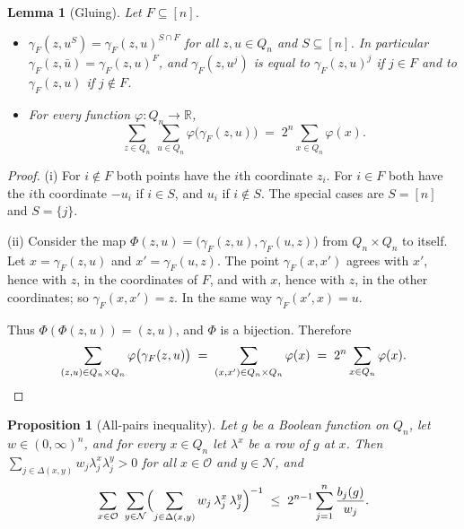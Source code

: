 \documentclass[11pt,reqno]{amsart}
\newtheorem{lemma}[theorem]{Lemma}
\newtheorem{proposition}[theorem]{Proposition}
\theoremstyle{definition}
\theoremstyle{remark}
\numberwithin{equation}{section}
\theoremstyle{named}
\theoremstyle{plain}
\newcommand{\R}{\mathbb{R}}
\newcommand{\cO}{\mathcal{O}}
\newcommand{\cN}{\mathcal{N}}
\begin{document}
\begin{lemma}[Gluing]\label{lem:glue}
Let $F\subseteq[n]$.
\begin{itemize}
\item[\textup{(i)}] $\gamma_F(z,u^{S})=\gamma_F(z,u)^{S\cap F}$ for all $z,u\in Q_n$ and
$S\subseteq[n]$. In particular $\gamma_F(z,\bar u)=\gamma_F(z,u)^{F}$, and
$\gamma_F(z,u^{j})$ is equal to $\gamma_F(z,u)^{j}$ if $j\in F$ and to $\gamma_F(z,u)$ if
$j\notin F$.
\item[\textup{(ii)}] For every function $\varphi\colon Q_n\to\R$,
\[
   \sum_{z\in Q_n}\ \sum_{u\in Q_n}\varphi\bigl(\gamma_F(z,u)\bigr)\;=\;2^{n}\sum_{x\in Q_n}\varphi(x).
\]
\end{itemize}
\end{lemma}

\begin{proof}
(i) For $i\notin F$ both points have the $i$th coordinate $z_i$. For $i\in F$ both have the $i$th
coordinate $-u_i$ if $i\in S$, and $u_i$ if $i\notin S$. The special cases are $S=[n]$ and
$S=\{j\}$.

(ii) Consider the map $\Phi(z,u)=\bigl(\gamma_F(z,u),\gamma_F(u,z)\bigr)$ from $Q_n\times Q_n$ to
itself. Let $x=\gamma_F(z,u)$ and $x'=\gamma_F(u,z)$. The point $\gamma_F(x,x')$ agrees with $x'$,
hence with $z$, in the coordinates of $F$, and with $x$, hence with $z$, in the other coordinates;
so $\gamma_F(x,x')=z$. In the same way $\gamma_F(x',x)=u$.

Thus $\Phi(\Phi(z,u))=(z,u)$, and $\Phi$
is a bijection. Therefore
\[
   \sum_{(z,u)\in Q_n\times Q_n}\varphi\bigl(\gamma_F(z,u)\bigr)
   \;=\;\sum_{(x,x')\in Q_n\times Q_n}\varphi(x)\;=\;2^{n}\sum_{x\in Q_n}\varphi(x). \qedhere
\]
\end{proof}

\begin{proposition}[All-pairs inequality]\label{prop:pairs}
Let $g$ be a Boolean function on $Q_n$, let $w\in(0,\infty)^{n}$, and for every $x\in Q_n$ let
$\lambda^{x}$ be a row of $g$ at $x$. Then
$\sum_{j\in\Delta(x,y)}w_j\lambda^{x}_j\lambda^{y}_j>0$ for all $x\in\cO$ and $y\in\cN$, and
\begin{equation}\label{eq:pairs}
   \sum_{x\in\cO}\ \sum_{y\in\cN}\Bigl(\sum_{j\in\Delta(x,y)}w_j\,\lambda^{x}_j\,\lambda^{y}_j\Bigr)^{-1}
   \;\le\;2^{n-1}\sum_{j=1}^{n}\frac{b_j(g)}{w_j}.
\end{equation}
\end{proposition}
\end{document}
